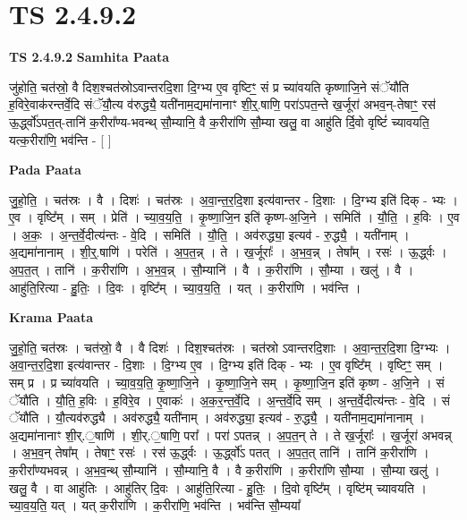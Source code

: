 \documentclass[17pt]{extarticle}
\begin{document}
\section*{ TS 2.4.9.2 }

\textbf{TS 2.4.9.2 } \newline
\textbf{Samhita Paata} \newline

जु॑होति॒ चत॑स्रो॒ वै दिश॒श्चत॑स्रोऽवान्तरदि॒शा दि॒ग्भ्य ए॒व वृष्टिꣳ॒॒ सं प्र च्या॑वयति कृष्णाजि॒ने संॅयौ॑ति ह॒विरे॒वाक॑रन्तर्वे॒दि संॅयौ॒त्य व॑रुद्ध्यै॒ यती॑नाम॒द्यमा॑नानाꣳ शी॒र्॒.षाणि॒ परा॑ऽपत॒न्ते ख॒र्जूरा॑ अभव॒न्-तेषाꣳ॒॒ रस॑ ऊ॒र्द्ध्वो॑ऽपत॒त्-तानि॑ क॒रीरा᳚ण्य-भवन्थ् सौ॒म्यानि॒ वै क॒रीरा॑णि सौ॒म्या खलु॒ वा आहु॑ति र्दि॒वो वृष्टिं॑ च्यावयति॒ यत्क॒रीरा॑णि॒ भव॑न्ति - [  ] \newline

\textbf{Pada Paata} \newline

जु॒हो॒ति॒ । चत॑स्रः । वै । दिशः॑ । चत॑स्रः । अ॒वा॒न्त॒र॒दि॒शा इत्य॑वान्तर - दि॒शाः । दि॒ग्भ्य इति॑ दिक् - भ्यः । ए॒व । वृष्टि᳚म् । सम् । प्रेति॑ । च्या॒व॒य॒ति॒ । कृ॒ष्णा॒जि॒न इति॑ कृष्ण-अ॒जि॒ने । समिति॑ । यौ॒ति॒ । ह॒विः । ए॒व । अ॒कः॒ । अ॒न्त॒र्वे॒दीत्य॑न्तः - वे॒दि । समिति॑ । यौ॒ति॒ । अव॑रुद्ध्या॒ इत्यव॑ - रु॒द्ध्यै॒ । यती॑नाम् । अ॒द्यमा॑नानाम् । शी॒र्॒.षाणि॑ । परेति॑ । अ॒प॒त॒न्न् । ते । ख॒र्जूराः᳚ । अ॒भ॒व॒न्न् । तेषा᳚म् । रसः॑ । ऊ॒र्द्ध्वः । अ॒प॒त॒त् । तानि॑ । क॒रीरा॑णि । अ॒भ॒व॒न्न् ।  सौ॒म्यानि॑ । वै । क॒रीरा॑णि । सौ॒म्या । खलु॑ । वै । आहु॑ति॒रित्या - हु॒तिः॒ । दि॒वः । वृष्टि᳚म् । च्या॒व॒य॒ति॒ । यत् । क॒रीरा॑णि । भव॑न्ति ।  \newline


\textbf{Krama Paata} \newline

जु॒हो॒ति॒ चत॑स्रः । चत॑स्रो॒ वै । वै दिशः॑ । दिश॒श्चत॑स्रः । चत॑स्रो ऽवान्तरदि॒शाः । अ॒वा॒न्त॒र॒दि॒शा दि॒ग्भ्यः । अ॒वा॒न्त॒र॒दि॒शा इत्य॑वान्तर - दि॒शाः । दि॒ग्भ्य ए॒व । दि॒ग्भ्य इति॑ दिक् - भ्यः । ए॒व वृष्टि᳚म् । वृष्टिꣳ॒॒ सम् । सम् प्र । प्र च्या॑वयति । च्या॒व॒य॒ति॒ कृ॒ष्णा॒जि॒ने । कृ॒ष्णा॒जि॒ने सम् । कृ॒ष्णा॒जि॒न इति॑ कृष्ण - अ॒जि॒ने । सं ॅयौ॑ति । यौ॒ति॒ ह॒विः । ह॒विरे॒व । ए॒वाकः॑ । अ॒क॒र॒न्त॒र्वे॒दि । अ॒न्त॒र्वे॒दि सम् । अ॒न्त॒र्वे॒दीत्य॑न्तः - वे॒दि । सं ॅयौ॑ति । यौ॒त्यव॑रुद्ध्यै । अव॑रुद्ध्यै॒ यती॑नाम् । अव॑रुद्ध्या॒ इत्यव॑ - रु॒द्ध्यै॒ । यती॑नाम॒द्यमा॑नानाम् । अ॒द्यमा॑नानाꣳ शी॒र्.॒षाणि॑ । शी॒र्.॒षाणि॒ परा᳚ । परा॑ ऽपतन्न् । अ॒प॒त॒न् ते । ते ख॒र्जूराः᳚ । ख॒र्जूरा॑ अभवन्न् । अ॒भ॒व॒न् तेषा᳚म् । तेषाꣳ॒॒ रसः॑ । रस॑ ऊ॒र्द्ध्वः । ऊ॒र्द्ध्वो॑ऽ पतत् । अ॒प॒त॒त् तानि॑ । तानि॑ क॒रीरा॑णि । क॒रीरा᳚ण्यभवन्न् । अ॒भ॒व॒न्थ् सौ॒म्यानि॑ । सौ॒म्यानि॒ वै । वै क॒रीरा॑णि । क॒रीरा॑णि सौ॒म्या । सौ॒म्या खलु॑ । खलु॒ वै । वा आहु॑तिः । आहु॑तिर् दि॒वः । आहु॑ति॒रित्या - हु॒तिः॒ । दि॒वो वृष्टि᳚म् । वृष्टि॑म् च्यावयति । च्या॒व॒य॒ति॒ यत् । यत् क॒रीरा॑णि । क॒रीरा॑णि॒ भव॑न्ति । भव॑न्ति सौ॒म्यया᳚ \newline
\end{document}
